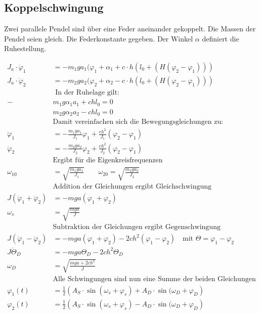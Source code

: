 \subsection{Koppelschwingung}
Zwei parallele Pendel sind über eine Feder aneinander gekoppelt. Die Massen der Pendel seien gleich. Die Federkonstante gegeben. Der Winkel $\alpha$ definiert die Ruhestellung.

\begin{minipage}{0.69\textwidth}
\begin{align*}
J_a\cdot \ddot{\varphi}_1 &= -m_1 g a_1(\varphi_1 +\alpha_1 + c \cdot h(l_0+(H(\varphi_2-\varphi_1)))\\
J_a\cdot \ddot{\varphi}_2 &= -m_2 g a_2(\varphi_2 +\alpha_2 - c \cdot h(l_0+(H(\varphi_2-\varphi_1)))\\[1em]
&\textrm{ In der Ruhelage gilt:}\\
-&m_1g \alpha_1 a_1+c h l_0 =0\\
&m_2g \alpha_2 a_2-c h l_0 =0\\[1em]
&\textrm{Damit vereinfachen sich die Bewegungsgleichungen zu:}\\
\ddot{\varphi}_1 &= -\frac{m_1 g a_1}{J_1} \varphi_1 + \frac{ch^2}{J_1} (\varphi_2 - \varphi_1)\\
\ddot{\varphi}_2 &= -\frac{m_2 g a_2}{J_2} \varphi_2 + \frac{ch^2}{J_2} (\varphi_2 - \varphi_1)\\[1em]
&\textrm{Ergibt für die Eigenkreisfrequenzen}\\
\omega_{10} &= \sqrt{\frac{m_1 g a_1}{J_1}}\qquad \omega_{20} = \sqrt{\frac{m_2 g a_2}{J_2}}\\[1em]
&\textrm{Addition der Gleichungen ergibt Gleichschwingung}\\
J(\ddot{\varphi}_1+\ddot{\varphi}_2) &= -mga(\varphi_1+\varphi_2)\\
\omega_s &=\sqrt{\frac{m g a}{J}}\\[1em]
&\textrm{Subtraktion der Gleichungen ergibt Gegenschwingung}\\
J(\ddot{\varphi}_1-\ddot{\varphi}_2) &= -mga(\varphi_1+\varphi_2)-2ch^2(\varphi_1-\varphi_2)\quad \textrm{mit } \Theta = \varphi_1 -\varphi_2\\
J\ddot{\Theta}_D &= -m g a \Theta_D -2c h^2 \Theta_D\\
\omega_D &= \sqrt{\frac{m g a + 2 ch^2}{J}}\\[1em]
&\textrm{Alle Schwingungen sind nun eine Summe der beiden Gleichungen}\\
\varphi_1(t) &=\frac{1}{2} \left(A_S \cdot \sin (\omega_s + \varphi_s) + A_D \cdot \sin( \omega_D + \varphi_D\right)\\
\varphi_2(t) &=\frac{1}{2} \left(A_S \cdot \sin (\omega_s + \varphi_s) - A_D \cdot \sin( \omega_D + \varphi_D\right)
\end{align*}
\end{minipage}
